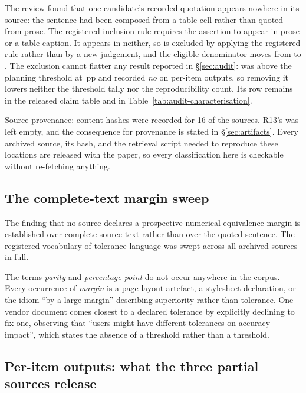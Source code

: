The review found that one candidate's recorded quotation appears nowhere in its
source: the sentence had been composed from a table cell rather than quoted from
prose. The registered inclusion rule requires the assertion to appear in prose or
a table caption. It appears in neither, so \AuditIneligibleClaim{} is excluded by
applying the registered rule rather than by a new judgement, and the eligible
denominator moves from \AuditFrozenCandidates{} to \AuditEligible{}. The
exclusion cannot flatter any result reported in \S\ref{sec:audit}:
\AuditIneligibleClaim{} was above the planning threshold at
\AuditMarginPP{}\,pp and recorded \emph{no} on per-item outputs, so removing it
lowers neither the threshold tally nor the reproducibility count. Its row remains
in the released claim table and in Table~\ref{tab:audit-characterisation}.

Source provenance: content hashes were recorded for 16 of the
\AuditFrozenCandidates{} sources. R13's was left empty, and the consequence for
provenance is stated in \S\ref{sec:artifacts}. Every archived source, its hash,
and the retrieval script needed to reproduce these locations are released with
the paper, so every classification here is checkable without re-fetching
anything.

\subsection{The complete-text margin sweep}
\label{app:audit:sweep}

The finding that no source declares a prospective numerical equivalence margin is
established over complete source text rather than over the quoted sentence. The
registered vocabulary of tolerance language was swept across all
\AuditFrozenCandidates{} archived sources in full.

The terms \emph{parity} and \emph{percentage point} do not occur anywhere in the
corpus. Every occurrence of \emph{margin} is a page-layout artefact, a stylesheet
declaration, or the idiom ``by a large margin'' describing superiority rather
than tolerance. One vendor document comes closest to a declared tolerance by
explicitly declining to fix one, observing that ``users might have different
tolerances on accuracy impact'', which states the absence of a threshold rather
than a threshold.

\subsection{Per-item outputs: what the three partial sources release}
\label{app:audit:v3detail}

